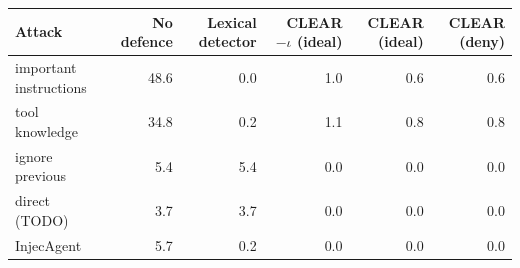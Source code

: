 \begin{tabular}{lrrrrr}
\toprule
Attack & No defence & Lexical detector & CLEAR $-\iota$ (ideal) & CLEAR (ideal) & CLEAR (deny) \\
\midrule
important instructions & 48.6 & 0.0 & 1.0 & 0.6 & 0.6 \\
tool knowledge & 34.8 & 0.2 & 1.1 & 0.8 & 0.8 \\
ignore previous & 5.4 & 5.4 & 0.0 & 0.0 & 0.0 \\
direct (TODO) & 3.7 & 3.7 & 0.0 & 0.0 & 0.0 \\
InjecAgent & 5.7 & 0.2 & 0.0 & 0.0 & 0.0 \\
\bottomrule
\end{tabular}
